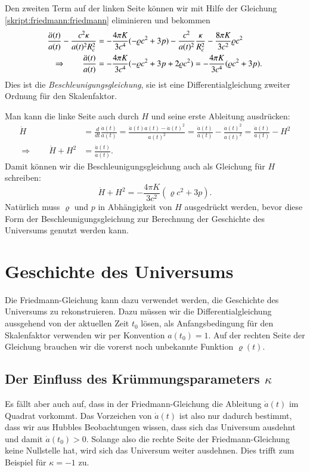 Den zweiten Term auf der linken Seite können wir mit Hilfe der Gleichung
\eqref{skript:friedmann:friedmann}
eliminieren und bekommen
\begin{align}
\frac{\ddot a(t)}{a(t)}
-
\frac{c^2\kappa }{a(t)^2R_c^2}
&=
-\frac{4\pi K}{3c^4}(-\varrho c^2 + 3p)
-\frac{c^2}{a(t)^2}\frac{\kappa }{R_c^2}
-\frac{8\pi K}{3c^2}\varrho c^2
\notag
\\
\Rightarrow\qquad
\frac{\ddot a(t)}{a(t)}
&=
-\frac{4\pi K}{3c^4}(-\varrho c^2 + 3p + 2 \varrho c^2)
=
-\frac{4\pi K}{3c^4}(\varrho c^2 + 3p).
\label{skript:friedmann:beschleunigung}
\end{align}
Dies ist die {\em Beschleunigungsgleichung}, sie ist eine
Differentialgleichung zweiter Ordnung für den Skalenfaktor.

Man kann die linke Seite auch durch $H$ und seine erste Ableitung
ausdrücken:
\begin{align*}
\dot H
&=
\frac{d}{dt}\frac{\dot a(t)}{a(t)}
=
\frac{\ddot a(t) a(t)-\dot a(t)^2}{a(t)^2}
=
\frac{\ddot a(t)}{a(t)} - \frac{\dot a(t)^2}{a(t)^2}
=
\frac{\ddot a(t)}{a(t)} - H^2
\\
\Rightarrow
\qquad
\dot H+H^2
&=
\frac{\ddot a(t)}{a(t)}.
\end{align*}
Damit können wir die Beschleunigungsgleichung auch als Gleichung
für $H$ schreiben:
\begin{equation}
\dot H+H^2
=
-\frac{4\pi K}{3c^2}(\varrho c^2 + 3p).
\end{equation}
Natürlich muss $\varrho$ und $p$ in Abhängigkeit von $H$ ausgedrückt
werden, bevor diese Form der Beschleunigungsgleichung zur Berechnung
der Geschichte des Universums genutzt werden kann.

\section{Geschichte des Universums}
Die Friedmann-Gleichung kann dazu verwendet werden, die Geschichte
des Universums zu rekonstruieren.
Dazu müssen wir die Differentialgleichung aussgehend von der
aktuellen Zeit $t_0$ lösen, als Anfangsbedingung für den
Skalenfaktor verwenden wir per Konvention $a(t_0)=1$.
Auf der rechten Seite der Gleichung brauchen wir die vorerst noch
unbekannte Funktion $\varrho(t)$.

\subsection{Der Einfluss des Krümmungsparameters $\kappa$}
Es fällt aber auch auf, dass in der Friedmann-Gleichung die Ableitung
$\dot a(t)$ im Quadrat vorkommt.
Das Vorzeichen von $\dot a(t)$ ist also nur dadurch bestimmt, dass
wir aus Hubbles Beobachtungen wissen, dass sich das Universum
ausdehnt und damit $\dot a(t_0) > 0$.
Solange also die rechte Seite der Friedmann-Gleichung keine Nullstelle
hat, wird sich das Universum weiter ausdehnen.
Dies trifft zum Beispiel für $\kappa=-1$ zu.

